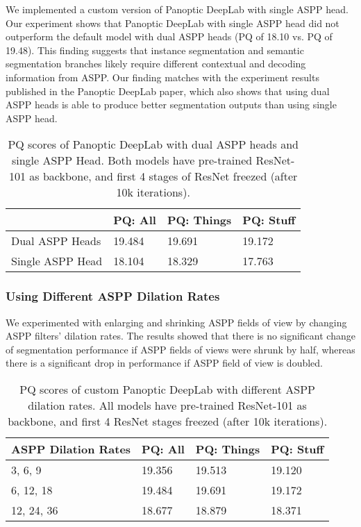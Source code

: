 \documentclass[10pt,twocolumn,letterpaper]{article}
\begin{document}
We implemented a custom version of Panoptic DeepLab with single ASPP head. Our experiment shows that Panoptic DeepLab with single ASPP head did not outperform the default model with dual ASPP heads (PQ of 18.10 vs. PQ of 19.48). This finding suggests that instance segmentation and semantic segmentation branches likely require different contextual and
decoding information from ASPP. Our finding matches with the experiment results published in the Panoptic DeepLab paper, which also shows that using dual ASPP heads is able to produce better segmentation outputs than using single ASPP head.

\begin{table}[htbp]\centering
\begin{tabular}{ || m{5em} | m{4em} | m{5em} | m{4em} ||} 
  \hline
   & PQ: All & PQ: Things & PQ: Stuff \\
  \hline
  Dual ASPP Heads & 19.484 & 19.691 & 19.172 \\ 
  \hline
  Single ASPP Head & 18.104 & 18.329 & 17.763 \\ 
  \hline
\end{tabular}
\caption{PQ scores of Panoptic DeepLab with dual ASPP heads and single ASPP Head. Both models have pre-trained ResNet-101 as backbone, and first 4 stages of ResNet freezed (after 10k iterations).}
\label{tab:deeplab_single_aspp_freeze_2}
\end{table}

\subsubsection{Using Different ASPP Dilation Rates}

We experimented with enlarging and shrinking ASPP fields of view by changing ASPP filters' dilation rates. The results showed that there is no significant change of segmentation performance if ASPP fields of views were shrunk by half, whereas there is a significant drop in performance if ASPP field of view is doubled. 

\begin{table}[htbp]\centering
\begin{tabular}{ || m{6em} | m{4em} | m{5em} | m{4em} ||} 
  \hline
  ASPP Dilation Rates & PQ: All & PQ: Things & PQ: Stuff \\
  \hline
  3,  6,  9  & 19.356 & 19.513 & 19.120 \\ 
  \hline
  6,  12, 18 & 19.484 & 19.691 & 19.172 \\ 
  \hline
  12, 24, 36 & 18.677 & 18.879 & 18.371 \\ 
  \hline
\end{tabular}
\caption{PQ scores of custom Panoptic DeepLab with different ASPP dilation rates. All models have pre-trained ResNet-101 as backbone, and first 4 ResNet stages freezed (after 10k iterations).}
\label{tab:deeplab_small_fov}
\end{table}
\end{document}

